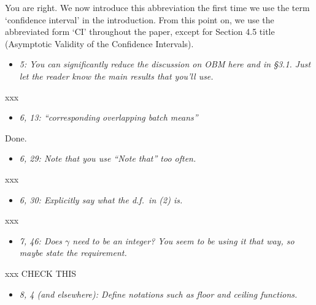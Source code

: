 \documentclass[11pt,notitlepage,onecolumn]{article}
\newcommand{\noi}{\noindent}
\begin{document}
\noi
You are right. 
We now introduce this abbreviation the first time we use the term `confidence interval' in the introduction. 
From this point on, we use the abbreviated form `CI' throughout the paper, except for Section 4.5 title (Asymptotic Validity of the Confidence Intervals). 
\medskip 



\begin{itemize}
\item[] \textit{5: You can significantly reduce the discussion on OBM here and in \S 3.1. 
Just let the reader know the main results that you'll use.}
\end{itemize}

\noi
xxx  
\medskip 



\begin{itemize}
\item[] \textit{6, 13: ``corresponding overlapping batch means''}
\end{itemize}

\noi
Done. 
\medskip 



\begin{itemize}
\item[] \textit{6, 29: Note that you use ``Note that'' too often.}
\end{itemize}

\noi
xxx  
\medskip 



\begin{itemize}
\item[] \textit{6, 30: Explicitly say what the d.f.\ in (2) is.}
\end{itemize}

\noi
xxx  
\medskip 



\begin{itemize}
\item[] \textit{7, 46: Does $\gamma$ need to be an integer? 
You seem to be using it that way, so maybe state the requirement.}
\end{itemize}

\noi
xxx  CHECK THIS
\medskip 



\begin{itemize}
\item[] \textit{8, 4 (and elsewhere): Define notations such as floor and ceiling functions.}
\end{itemize}
\end{document}
